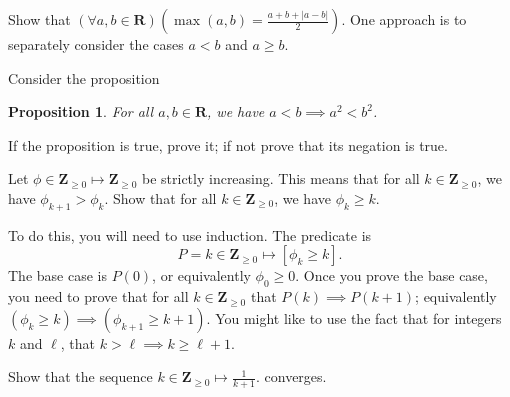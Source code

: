 \documentclass[12pt,fleqn,answers]{exam}
\newtheorem{prop}{Proposition}
\newcommand{\reals}{\mathbf{R}}
\newcommand{\integers}{\mathbf{Z}}
\begin{document}
\begin{questions}

\question [10] Show that $\left(\forall a,b \in \reals \right)
\left(\max(a,b) = \frac{a+b+|a-b|}{2}\right)$. One approach is 
to separately consider the cases $a<b$ and $a \geq b$.

\begin{solution}

\end{solution}

\question [10] Consider the proposition

\begin{prop} For all $a,b \in \reals$, we have $ a < b \implies a^2 < b^2 $. \end{prop}

If the proposition is true, prove it; if not prove that its negation is true.


\begin{solution}

\end{solution}



\question [10] Let $\phi \in \integers_{\geq 0} \mapsto \integers_{\geq 0} $ be strictly increasing. This means that for all
$k \in \integers_{\geq 0}$, we have $\phi_{k+1} >  \phi_k$.  Show that for all $k \in \integers_{\geq 0}$, we have $\phi_k \geq k$.

\quad To do this, you will need to use induction.  The predicate is
\begin{equation*}
   P = k \in \integers_{\geq 0} \mapsto \left[\phi_k \geq k \right].
\end{equation*}
The base case is $P(0)$, or  equivalently $\phi_0 \geq 0$.   Once you prove the base case, you need to prove that for all $k \in \integers_{\geq 0}$
that $P(k) \implies P(k+1)$; equivalently $\left(\phi_k \geq k \right) \implies \left(\phi_{k+1} \geq k+1 \right)$.  
You might like to use the fact that for integers $k$ and $\ell$, that $ k > \ell \implies k \geq \ell+1$.

\begin{solution}

\end{solution}

\question [10] Show that the sequence 
    $k \in \integers_{\geq 0} \mapsto \frac{1}{k+1}$.
converges.

\begin{solution}

\end{solution}
    


\end{questions}
\end{document}
